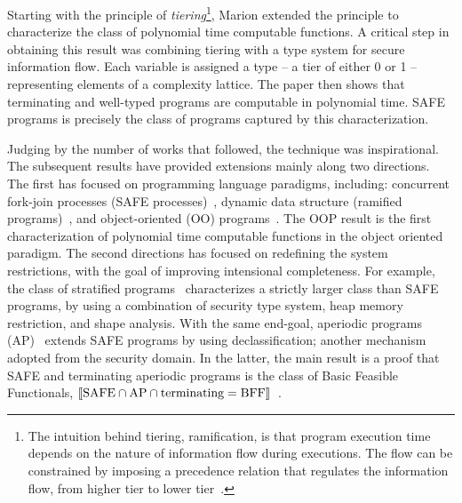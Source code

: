 Starting with the principle of {\emph{tiering}}\footnote{
The intuition behind tiering, \aka ramification, is that program execution time depends on the nature of information flow during executions.
The flow can be constrained by imposing a precedence relation that regulates the information flow,
\eg from higher tier to lower tier~\cite{leivant1995, leivant2013}.},
Marion extended the principle to characterize the class of {polynomial time computable functions}.
A critical step in obtaining this result was combining tiering with a type system 
for secure information flow.
Each variable is assigned a type -- a {tier} of either 0 or 1 -- representing elements of a complexity lattice.
The paper then shows that terminating and well-typed programs are computable in polynomial time.
SAFE programs is precisely the class of programs captured by this characterization.

Judging by the number of works that followed, the technique was inspirational.
The subsequent results have provided extensions mainly along two directions.
The first has focused on programming language paradigms, including: 
concurrent fork-join processes (SAFE processes)~\cite{hainry2013},
dynamic data structure (ramified programs)~\cite{leivant2013}, and
{object-oriented (OO) programs}~\cite{hainry2015}.
The OOP result is the first characterization of polynomial time computable functions in the object oriented paradigm.
The second directions has focused on redefining the system restrictions, with the goal of improving intensional completeness.
For example, the class of stratified programs~\cite{hainry2023} characterizes a strictly larger class than SAFE programs,
by using a combination of {security type system}, heap memory restriction, and shape analysis.
With the same end-goal, aperiodic programs (AP)~\cite{hainry2024} extends SAFE programs by using declassification;
another mechanism adopted from the security domain.
In the latter, the main result is a proof that SAFE and terminating aperiodic programs is the class of Basic Feasible Functionals, \ie \(\llbracket\text{SAFE} \cap \text{AP} \cap \text{terminating} = \text{BFF}\rrbracket\)~\cite{hainry2020,hainry2024}.

